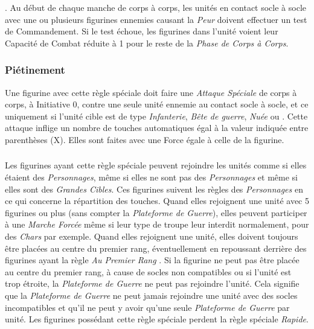 . Au début de chaque manche de corps à corps, les unités en contact socle à socle avec une ou plusieurs figurines ennemies causant la \emph{Peur} doivent effectuer un test de Commandement. Si le test échoue, les figurines dans l'unité voient leur Capacité de Combat réduite à 1 pour le reste de la \emph{Phase de Corps à Corps}.

\subsubsection*{Piétinement }

Une figurine avec cette règle spéciale doit faire une \emph{Attaque Spéciale} de corps à corps, à Initiative 0, contre une seule unité ennemie au contact socle à socle, et ce uniquement si l'unité cible est de type \emph{Infanterie}, \emph{Bête de guerre}, \emph{Nuée} ou . Cette attaque inflige un nombre de touches automatiques égal à la valeur indiquée entre parenthèses (X). Elles sont faites avec une Force égale à celle de la figurine. 

\subsubsection*{}

Les figurines ayant cette règle spéciale peuvent rejoindre les unités comme si elles étaient des \emph{Personnages}, même si elles ne sont pas des \emph{Personnages} et même si elles sont des \emph{Grandes Cibles}. Ces figurines suivent les règles des \emph{Personnages} en ce qui concerne la répartition des touches. Quand elles rejoignent une unité avec 5 figurines ou plus (sans compter la \emph{Plateforme de Guerre}), elles peuvent participer à une \emph{Marche Forcée} même si leur type de troupe leur interdit normalement, pour des \emph{Chars} par exemple. Quand elles rejoignent une unité, elles doivent toujours être placées au centre du premier rang, éventuellement en repoussant derrière des figurines ayant la règle \emph{Au Premier Rang} . Si la figurine ne peut pas être placée au centre du premier rang, à cause de socles non compatibles ou si l'unité est trop étroite, la \emph{Plateforme de Guerre} ne peut pas rejoindre l'unité. Cela signifie que la \emph{Plateforme de Guerre} ne peut jamais rejoindre une unité avec des socles incompatibles et qu'il ne peut y avoir qu'une seule \emph{Plateforme de Guerre} par unité. Les figurines possédant cette règle spéciale perdent la règle spéciale \emph{Rapide}.

